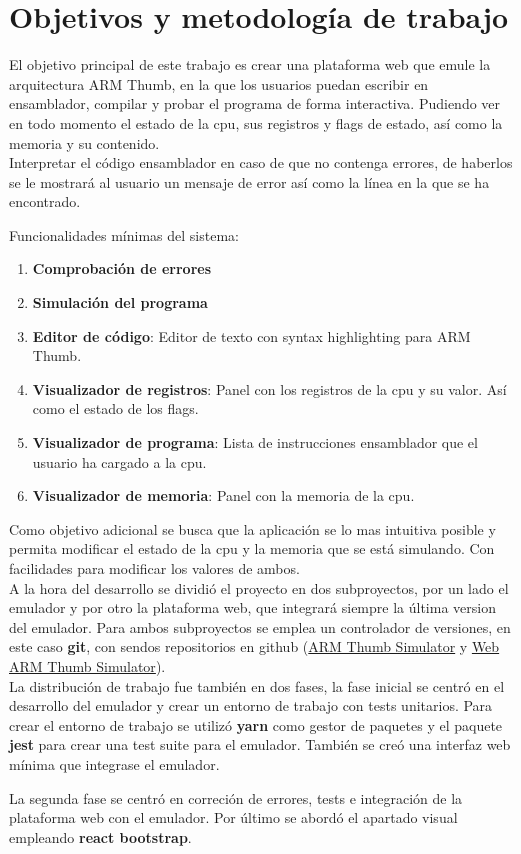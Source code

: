 \section{Objetivos y metodología de trabajo}
{
    El objetivo principal de este trabajo es crear una plataforma web que emule la arquitectura ARM Thumb, en la que los usuarios puedan escribir en ensamblador, compilar y probar el programa de forma interactiva.
    Pudiendo ver en todo momento el estado de la cpu, sus registros y flags de estado, así como la memoria y su contenido. \\

    Interpretar el código ensamblador en caso de que no contenga errores, de haberlos se le mostrará al usuario un mensaje de error así como la línea en la que se ha encontrado. 
    
    Funcionalidades mínimas del sistema:
    \begin{enumerate}
        \item \textbf{Comprobación de errores}
        \item \textbf{Simulación del programa}
        \item \textbf{Editor de código}: Editor de texto con syntax highlighting para ARM Thumb.
        \item \textbf{Visualizador de registros}: Panel con los registros de la cpu y su valor. Así como el estado de los flags.
        \item \textbf{Visualizador de programa}: Lista de instrucciones ensamblador que el usuario ha cargado a la cpu.
        \item \textbf{Visualizador de memoria}: Panel con la memoria de la cpu.
    \end{enumerate}

    Como objetivo adicional se busca que la aplicación se lo mas intuitiva posible y permita modificar el estado de la cpu y la memoria que se está simulando. Con facilidades para modificar los valores de ambos. \\

    A la hora del desarrollo se dividió el proyecto en dos subproyectos, por un lado el emulador y por otro la plataforma web, que integrará siempre la última version del emulador.
    Para ambos subproyectos se emplea un controlador de versiones, en este caso \textbf{git}, con sendos repositorios en github (\href{https://github.com/FreddyJS/armthumb-emul}{ARM Thumb Simulator} y \href{https://github.com/FreddyJS/wthumb}{Web ARM Thumb Simulator}). \\

    La distribución de trabajo fue también en dos fases, la fase inicial se centró en el desarrollo del emulador y crear un entorno de trabajo con tests unitarios.
    Para crear el entorno de trabajo se utilizó \textbf{yarn} como gestor de paquetes y el paquete \textbf{jest} para crear una test suite para el emulador. También se creó una interfaz web mínima que integrase el emulador.

    La segunda fase se centró en correción de errores, tests e integración de la plataforma web con el emulador. 
    Por último se abordó el apartado visual empleando \textbf{react bootstrap}.
}

